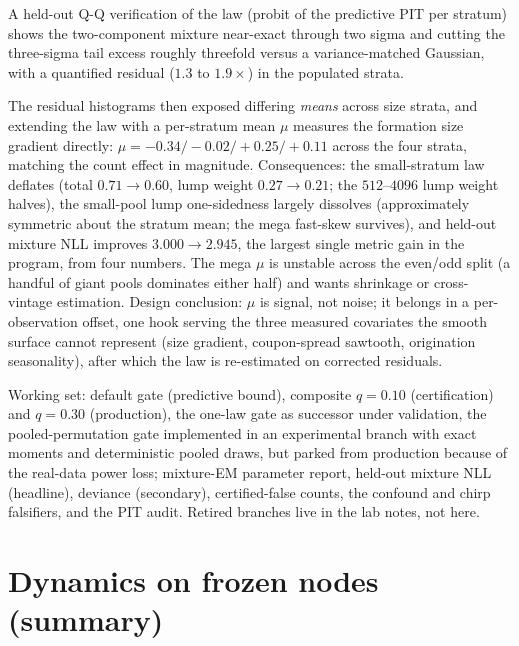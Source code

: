 \documentclass[11pt]{article}
\begin{document}
A held-out Q-Q verification of the law (probit of the predictive PIT
per stratum) shows the two-component mixture near-exact through two
sigma and cutting the three-sigma tail excess roughly threefold versus
a variance-matched Gaussian, with a quantified residual ($1.3$ to
$1.9\times$) in the populated strata.

The residual histograms then exposed differing \emph{means} across size
strata, and extending the law with a per-stratum mean $\mu$ measures
the formation size gradient directly: $\mu = -0.34 / -0.02 / +0.25 /
+0.11$ across the four strata, matching the count effect in magnitude.
Consequences: the small-stratum law deflates (total $0.71\to0.60$,
lump weight $0.27\to0.21$; the $512$--$4096$ lump weight halves), the
small-pool lump one-sidedness largely dissolves (approximately
symmetric about the stratum mean; the mega fast-skew survives), and
held-out mixture NLL improves $3.000\to2.945$, the largest single
metric gain in the program, from four numbers. The mega $\mu$ is unstable across the
even/odd split (a handful of giant pools dominates either half) and
wants shrinkage or cross-vintage estimation. Design conclusion: $\mu$
is signal, not noise; it belongs in a per-observation offset, one hook
serving the three measured covariates the smooth surface cannot
represent (size gradient, coupon-spread sawtooth, origination
seasonality), after which the law is re-estimated on corrected
residuals.

Working set: default gate (predictive bound), composite $q=0.10$
(certification) and $q=0.30$ (production), the one-law gate as
successor under validation, the pooled-permutation gate implemented in an experimental branch with exact moments and deterministic pooled draws, but parked from production because of the real-data power loss; mixture-EM parameter report, held-out mixture NLL
(headline), deviance (secondary), certified-false counts, the confound
and chirp falsifiers, and the PIT audit. Retired branches live in the
lab notes, not here.

\section{Dynamics on frozen nodes (summary)}\label{sec:dynamics}
\end{document}
